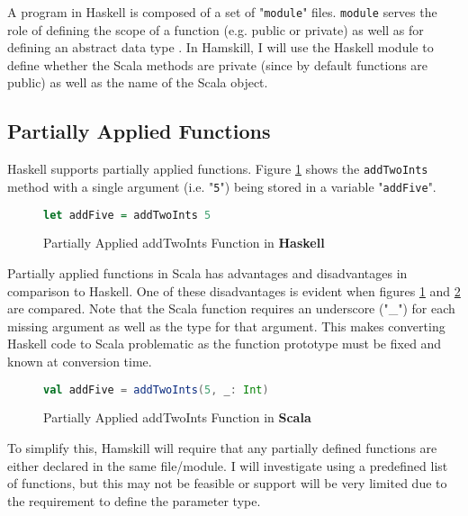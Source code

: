 \documentclass{report}
\begin{document}
A program in Haskell is composed of a set of "{\tt module}" files.  {\tt module} serves the role of defining the scope of a function (e.g. public or private) as well as for defining an abstract data type \cite{haskellModule}.  In Hamskill, I will use the Haskell module to define whether the Scala methods are private (since by default functions are public) as well as the name of the Scala object.

\subsection{Partially Applied Functions}\label{partiallyAppliedFunctions}

Haskell supports partially applied functions.  Figure \ref{fig:addFiveHaskell} shows the {\tt addTwoInts} method with a single argument (i.e. "{\tt 5}") being stored in a variable "{\tt addFive}".  

\begin{figure}[H]\label{fig:addFiveHaskell}
\begin{mdframed}
\begin{lstlisting}[language=Haskell]
let addFive = addTwoInts 5
\end{lstlisting}
\end{mdframed}
\caption{Partially Applied addTwoInts Function in \bf{Haskell}}
\end{figure}

Partially applied functions in Scala has advantages and disadvantages in comparison to Haskell.  One of these disadvantages is evident when figures \ref{fig:addFiveHaskell} and \ref{fig:addFiveScala} are compared.  Note that the Scala function requires an underscore ("\_") for each missing argument as well as the type for that argument.  This makes converting Haskell code to Scala problematic as the function prototype must be fixed and known at conversion time.  

\begin{figure}[H]\label{fig:addFiveScala}
\begin{mdframed}
\begin{lstlisting}[language=Scala]
val addFive = addTwoInts(5, _: Int)
\end{lstlisting}
\end{mdframed}
\caption{Partially Applied addTwoInts Function in \bf{Scala}}
\end{figure}

To simplify this, Hamskill will require that any partially defined functions are either declared in the same file/module.  I will investigate using a predefined list of functions, but this may not be feasible or support will be very limited due to the requirement to define the parameter type.
\end{document}

